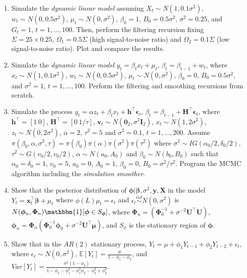 \begin{enumerate}
	\item Simulate the \textit{dynamic linear model} assuming $X_t\sim N(1, 0.1\sigma^2)$, $w_t\sim N(0, 0.5\sigma^2)$, $\mu_t\sim N(0, \sigma^2)$, $\beta_0=1$, ${B}_0=0.5\sigma^2$, $\sigma^2=0.25$, and ${G}_t=1$, $t=1,\dots,100$. Then, perform the filtering recursion fixing $\Sigma=25\times 0.25$, $\Omega_1=0.5\Sigma$ (high signal-to-noise ratio) and  $\Omega_2=0.1\Sigma$ (low signal-to-noise ratio). Plot and compare the results. 	
	
	\item Simulate the \textit{dynamic linear model} $y_t=\beta_t x_t + \mu_t$, $\beta_t=\beta_{t-1}+w_t$, where $x_t\sim N(1, 0.1\sigma^2)$, $w_t\sim N(0, 0.5\sigma^2)$, $\mu_t\sim N(0, \sigma^2)$, $\beta_0=0$, $B_0=0.5\sigma^2$, and $\sigma^2=1$, $t=1,\dots,100$. Perform the filtering and smoothing recursions from scratch. 	
	
	\item Simulate the process $y_t=\alpha z_t + \beta_t x_t + \bm{h}^{\top}\bm{\epsilon}_t$, $\beta_t=\beta_{t-1}+\bm{H}^{\top}\bm{\epsilon}_t$, where $\bm{h}^{\top}=[1 \ 0]$, $\bm{H}^{\top}=[0 \ 1/\tau]$, $\bm{v}_t\sim N(\bm{0}_2, \sigma^2\bm{I}_2)$, $x_t\sim N(1, 2\sigma^2)$, $z_t\sim N(0, 2\sigma^2)$, $\alpha=2$, $\tau^2=5$ and $\sigma^2=0.1$, $t=1,\dots,200$. Assume $\pi({\beta}_0,{\alpha},\sigma^2,{\tau})=\pi({\beta}_0)\pi({\alpha})\pi(\sigma^2)\pi(\tau^2)$ where $\sigma^2\sim IG(\alpha_0/2,\delta_0/2)$, $\tau^2\sim G(v_{0}/2,v_{0}/2)$, ${\alpha}\sim N({a}_0,{A}_0)$ and ${\beta}_0\sim N({b}_0,{B}_0)$ such that $\alpha_0=\delta_0=1$, $v_0=5$, $a_0=0$, $A_0=1$, $\beta_0=0$, $B_0=\sigma^2/\tau^2$. Program the MCMC algorithm including the \textit{simulation smoother}.
	
	\item Show that the posterior distribution of $\bm{\phi}|\bm{\beta},\sigma^2,\bm{y},\bm{X}$ in the model $Y_t=\bm{x}_t^{\top}\bm{\beta}+\mu_t$ where $\phi(L)\mu_t=\epsilon_t$ and $\epsilon_t\stackrel{iid}{\sim}N(0,\sigma^2)$ is $N(\bm{\phi}_n, \bm{\Phi}_n)\mathbbm{1}[\bm{\phi}\in S_{\bm{\phi}}]$, where $\bm{\Phi}_n=(\bm{\Phi}_0^{-1}+\sigma^{-2}\bm{U}^{\top}\bm{U})$, $\bm{\phi}_n=\bm{\Phi}_n(\bm{\Phi}_0^{-1}\bm{\phi}_0+\sigma^{-2}\bm{U}^{\top}\bm{\mu})$, and $S_{\phi}$ is the stationary region of $\bm{\phi}$.	  
	
	\item Show that in the $AR(2)$ stationary process, $Y_t=\mu+\phi_1Y_{t-1}+\phi_2Y_{t-2}+\epsilon_t$, where $\epsilon_t\sim N(0,\sigma^2)$, $\mathbb{E}[Y_t]=\frac{\mu}{1-\phi_1-\phi_2}$, and $Var[Y_t]=\frac{\sigma^2(1-\phi_2)}{1-\phi_2-\phi_1^2-\phi_1^2\phi_2-\phi_2^2+\phi_2^3}$.
	

\end{enumerate}
